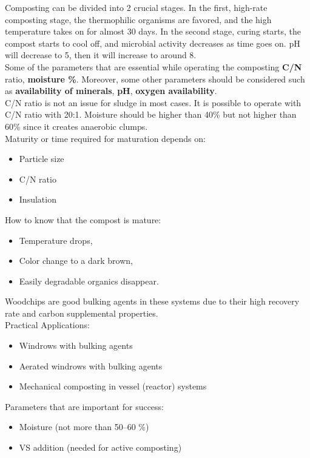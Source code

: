\documentclass{article}
\numberwithin{equation}{section}
\begin{document}
\begin{enumerate} [start=2]
    Composting can be divided into 2 crucial stages. In the first, high-rate composting stage, the thermophilic organisms are favored, and the high temperature takes on for almost 30 days. In the second stage, curing starts, the compost starts to cool off, and microbial activity decreases as time goes on.
    pH will decrease to 5, then it will increase to around 8.\\
    Some of the parameters that are essential while operating the composting \textbf{C/N} ratio, \textbf{moisture \%}. Moreover, some other parameters should be considered such as \textbf{availability of minerals}, \textbf{pH}, \textbf{oxygen availability}.\\
    C/N ratio is not an issue for sludge in most cases. It is possible to operate with C/N ratio with 20:1. Moisture should be higher than 40\% but not higher than 60\% since it creates anaerobic clumps.\\
    Maturity or time required for maturation depends on:
    \begin{itemize}
        \item Particle size
        \item C/N ratio
        \item Insulation
    \end{itemize}
    How to know that the compost is mature:
    \begin{itemize}
        \item Temperature drops,
        \item Color change to a dark brown,
        \item Easily degradable organics disappear.
    \end{itemize}
    Woodchips are good bulking agents in these systems due to their high recovery rate and carbon supplemental properties.\\
    Practical Applications:
    \begin{itemize}
        \item Windrows with bulking agents
        \item Aerated windrows with bulking agents
        \item Mechanical composting in vessel (reactor) systems
    \end{itemize}
    Parameters that are important for success:
    \begin{itemize}
        \item Moisture (not more than 50--60 \%)
        \item VS addition (needed for active composting)

\end{itemize}
\end{enumerate}
\end{document}
